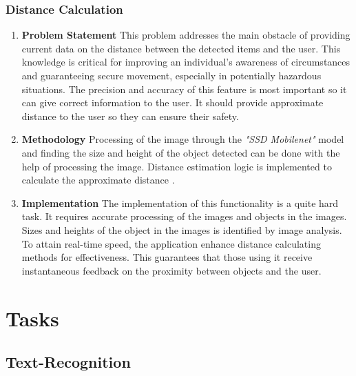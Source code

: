 \documentclass[MScCS]{uccthesis}
\begin{document}
\subsubsection{Distance Calculation}
\begin{enumerate}
    \item \textbf{Problem Statement}
   This problem addresses the main obstacle of providing current data on the distance between the detected items and the user. This knowledge is critical for improving an individual's awareness of circumstances and guaranteeing secure movement, especially in potentially hazardous situations. The precision and accuracy of this feature is most important so it can give correct information to the user. It should provide approximate distance to the user so they can ensure their safety.

    \item \textbf{Methodology}
    Processing of the image through the \textit{"SSD Mobilenet"} model and finding the size and height of the object detected can be done with the help of processing the image. Distance estimation logic is implemented to calculate the approximate distance .
    \item \textbf{Implementation}
    The implementation of this functionality is a quite hard task. It requires accurate processing of the images and objects in the images. Sizes and heights of the object in the images is identified by image analysis. To attain real-time speed, the application enhance distance calculating methods for effectiveness. This guarantees that those using it receive instantaneous feedback on the proximity between objects and the user.



\end{enumerate}

\section{Tasks}

\subsection{Text-Recognition}
\end{document}
